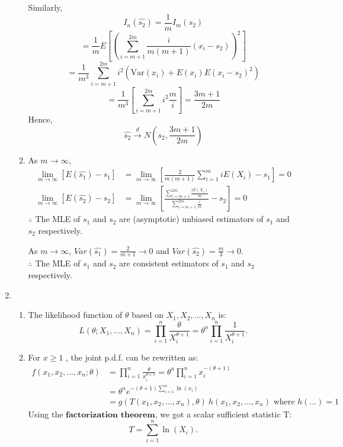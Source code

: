 \documentclass{article}
\begin{document}
\begin{enumerate}
\begin{enumerate}[label=(\roman*)]
    Similarly,
    \[
    I_n(\hat{s_2}) = \frac{1}{m} I_m(s_2)
    \]
    \[
    = \frac{1}{m} E \left[ \left( \sum_{i=m+1}^{2m} \frac{i}{m(m+1)} (x_i - s_2) \right)^2 \right]
    \]
    \[
    = \frac{1}{m^3} \sum_{i=m+1}^{2m} i^2 \left( \text{Var}(x_i) + E(x_i) E(x_i - s_2)^2 \right)
    \]
    \[
    = \frac{1}{m^3} \left[ \sum_{i=m+1}^{2m} i^2 \frac{m}{i} \right]
    = \frac{3m+1}{2m}
    \]
    Hence,
    \[
    \hat{s_2} \xrightarrow{d} N \left( s_2, \frac{3m+1}{2m} \right)
    \]

    \item As $m \to \infty$,
    \begin{align*}
    \lim_{m \to \infty} [E(\hat{s_1}) - s_1] &= \lim_{m \to \infty} \left[ \frac{2}{m(m+1)} \sum_{i=1}^{m} iE(X_i) - s_1 \right] = 0 \\
    \lim_{m \to \infty} [E(\hat{s_2}) - s_2] &= \lim_{m \to \infty} \left[ \frac{\sum_{i=m+1}^{2m} \frac{iE(X_i)}{m}}{\sum_{i=m+1}^{2m} \frac{i}{m}} - s_2 \right] = 0
    \end{align*}
    $\therefore$ The MLE of $s_1$ and $s_2$ are (asymptotic) unbiased estimators of $s_1$ and $s_2$ respectively.

    As $m \to \infty$, $Var(\hat{s_1}) = \frac{2}{m+1} \to 0$ and $Var(\hat{s_2}) = \frac{m}{3} \to 0$. \\
    $\therefore$ The MLE of $s_1$ and $s_2$ are consistent estimators of $s_1$ and $s_2$ respectively.

    \end{enumerate}


\item
    \begin{enumerate}[label=(\roman*)]

    \item The likelihood function of $\theta$ based on $X_1, X_2, \dots, X_n$ is:
    \[
    L(\theta; X_1, \dots, X_n) = \prod_{i=1}^n \frac{\theta}{X_i^{\theta + 1}} = \theta^n \prod_{i=1}^n \frac{1}{X_i^{\theta + 1}}.
    \]

    \item For $x \geq 1$ , the joint p.d.f. can be rewritten as:
    \begin{align*}
    f(x_1, x_2, \dots, x_n; \theta) &= \prod_{i=1}^n \frac{\theta}{x_i^{\theta + 1}} = \theta^n \prod_{i=1}^n {x_i^{-(\theta + 1)}} \\
    &= \theta^n e^{-(\theta + 1) \sum_{i=1}^n \ln(x_i)} \\
    &= g(T(x_1, x_2, \dots, x_n), \theta) \ h(x_1, x_2, \dots, x_n) \text{ where } h(\dots) = 1
    \end{align*}
    Using the $\textbf{factorization theorem}$, we got a scalar sufficient statistic T:
    \[
    T = \sum_{i=1}^n \ln(X_i).
    \]


\end{enumerate}
\end{enumerate}
\end{document}
